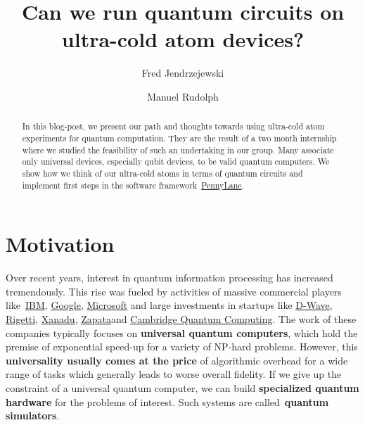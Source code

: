 \documentclass[%
 reprint,
 amsmath,amssymb,
 aps,
]{revtex4-1}
\begin{document}
\title{Can we run quantum circuits on ultra-cold atom devices?}

\author{Fred Jendrzejewski}

\author{Manuel Rudolph}




\begin{abstract}
In this blog-post, we present our path and thoughts towards using
ultra-cold atom experiments for quantum computation. They are the result
of a two month internship where we studied the feasibility of such an
undertaking in our group. Many associate only universal devices,
especially qubit devices, to be valid quantum computers. We show how we
think of our ultra-cold atoms in terms of quantum circuits and implement
first steps in the software
framework~\href{https://pennylane.ai/}{PennyLane}.%
\end{abstract}%



\maketitle


\section*{Motivation}

{\label{773840}}

Over recent years, interest in quantum information processing has
increased tremendously. This rise was fueled by activities of massive
commercial players
like~{\href{https://www.ibm.com/quantum-computing/}{IBM},}
\href{https://research.google/teams/applied-science/quantum/}{Google},
\href{https://www.microsoft.com/en-us/quantum}{Microsoft} and large
investments in startups like \href{https://www.dwavesys.com/}{D-Wave},
\href{https://rigetti.com/}{Rigetti},
\href{https://www.xanadu.ai/}{Xanadu},
\href{https://www.zapatacomputing.com/}{Zapata}and
\href{https://cambridgequantum.com/}{Cambridge Quantum Computing}. The
work of these companies typically focuses on \textbf{universal quantum
computers}, which hold the premise of exponential speed-up for a variety
of NP-hard problems. However, this \textbf{universality usually comes at
the price} of algorithmic overhead for a wide range of tasks which
generally leads to worse overall fidelity. If we give up the constraint
of a universal quantum computer, we can build \textbf{specialized
quantum hardware} for the problems of interest. Such systems are
called~\textbf{quantum simulators}.~
\end{document}
